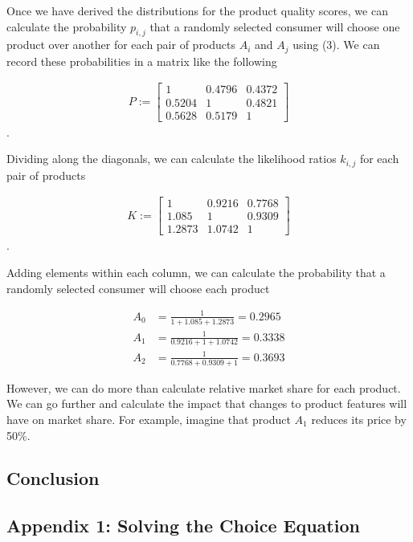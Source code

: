 \documentclass[]{article}
\begin{document}
Once we have derived the distributions for the product quality scores,
we can calculate the probability \(p_{i,j}\) that a randomly selected
consumer will choose one product over another for each pair of products
\(A_i\) and \(A_j\) using (3). We can record these probabilities in a
matrix like the following

\begin{align*}
P := \begin{bmatrix}
1 & 0.4796 & 0.4372\\
0.5204 & 1 & 0.4821\\
0.5628 & 0.5179 & 1
\end{bmatrix}
\end{align*}.

Dividing along the diagonals, we can calculate the likelihood ratios
\(k_{i,j}\) for each pair of products

\begin{align*}
K := \begin{bmatrix}
1 & 0.9216 & 0.7768\\
1.085 & 1 & 0.9309\\
1.2873 & 1.0742 & 1
\end{bmatrix}
\end{align*}.

Adding elements within each column, we can calculate the probability
that a randomly selected consumer will choose each product

\begin{align*}
A_0 &= \frac{1}{1 + 1.085 + 1.2873} = 0.2965\\
A_1 &= \frac{1}{0.9216 + 1 + 1.0742} = 0.3338\\
A_2 &= \frac{1}{0.7768 + 0.9309 + 1} = 0.3693
\end{align*}

However, we can do more than calculate relative market share for each
product. We can go further and calculate the impact that changes to
product features will have on market share. For example, imagine that
product \(A_1\) reduces its price by 50\%.

\hypertarget{conclusion}{%
\subsection{Conclusion}\label{conclusion}}

\hypertarget{appendix-1-solving-the-choice-equation}{%
\subsection{Appendix 1: Solving the Choice
Equation}\label{appendix-1-solving-the-choice-equation}}
\end{document}
